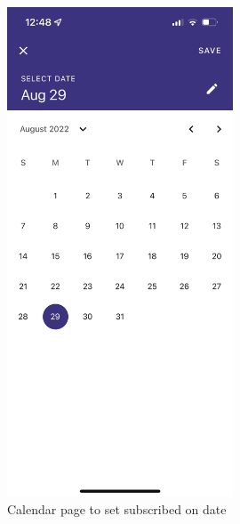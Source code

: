 \documentclass[12pt]{article}
\begin{document}
\begin{figure}[h!]
    \centering
    \begin{minipage}[c]{0.45\textwidth}
        \centering
        \includegraphics[width=0.6\textwidth, clip]{../../assets/smartphone/calendar.PNG}
        \caption{Calendar page to set subscribed on date}
        \label{fig:calendar}
    \end{minipage}\hspace{1cm}%
    \begin{minipage}[c]{0.45\textwidth}
        \centering

\end{minipage}
\end{figure}
\end{document}
